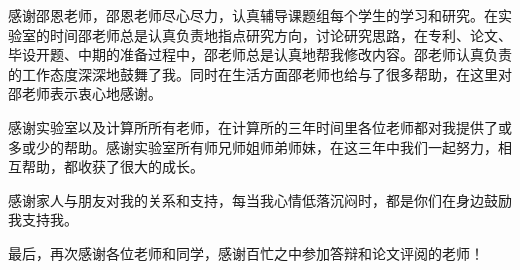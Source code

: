 感谢邵恩老师，邵恩老师尽心尽力，认真辅导课题组每个学生的学习和研究。在实验室的时间邵老师总是认真负责地指点研究方向，讨论研究思路，在专利、论文、毕设开题、中期的准备过程中，邵老师总是认真地帮我修改内容。邵老师认真负责的工作态度深深地鼓舞了我。同时在生活方面邵老师也给与了很多帮助，在这里对邵老师表示衷心地感谢。

感谢实验室以及计算所所有老师，在计算所的三年时间里各位老师都对我提供了或多或少的帮助。感谢实验室所有师兄师姐师弟师妹，在这三年中我们一起努力，相互帮助，都收获了很大的成长。

感谢家人与朋友对我的关系和支持，每当我心情低落沉闷时，都是你们在身边鼓励我支持我。

最后，再次感谢各位老师和同学，感谢百忙之中参加答辩和论文评阅的老师！

\cleardoublepage[plain]%
